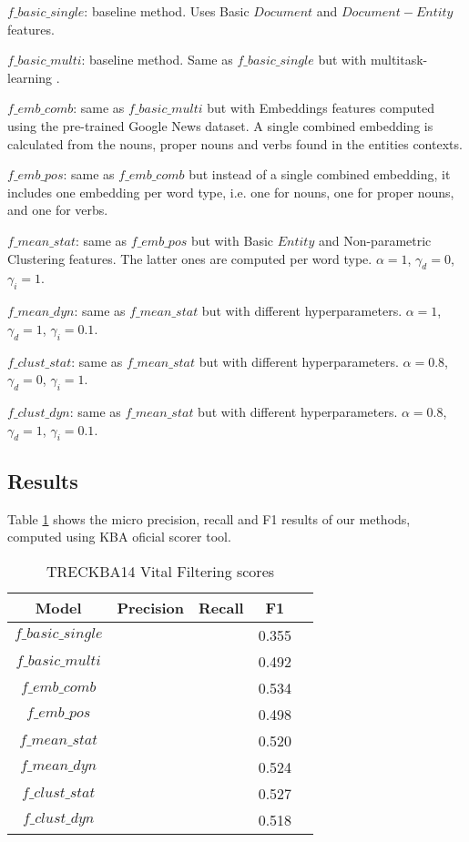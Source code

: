 \documentclass{article}
\begin{document}
\begin{itemize*}
  \item $f\_basic\_single$: baseline method. Uses Basic $Document$ and $Document-Entity$ features.
  \item $f\_basic\_multi$: baseline method. Same as $f\_basic\_single$ but with multitask-learning \cite{Caruana93multitasklearning}.
  \item $f\_emb\_comb$: same as $f\_basic\_multi$ but with Embeddings features computed using the pre-trained Google News dataset. A single combined embedding is calculated from the nouns, proper nouns and verbs found in the entities contexts.
  \item $f\_emb\_pos$: same as $f\_emb\_comb$ but instead of a single combined embedding, it includes one embedding per word type, i.e. one for nouns, one for proper nouns, and one for verbs.
  \item $f\_mean\_stat$: same as $f\_emb\_pos$ but with Basic $Entity$ and Non-parametric Clustering features. The latter ones are computed per word type. $\alpha = 1$, $\gamma_d = 0$, $\gamma_i = 1$.
  \item $f\_mean\_dyn$: same as $f\_mean\_stat$ but with different hyperparameters. $\alpha = 1$, $\gamma_d = 1$, $\gamma_i = 0.1$.
  \item $f\_clust\_stat$: same as $f\_mean\_stat$ but with different hyperparameters. $\alpha = 0.8$, $\gamma_d = 0$, $\gamma_i = 1$.
  \item $f\_clust\_dyn$: same as $f\_mean\_stat$ but with different hyperparameters. $\alpha = 0.8$, $\gamma_d = 1$, $\gamma_i = 0.1$.
\end{itemize*}

\subsection{Results}

Table \ref{res} shows the micro precision, recall and F1 results of our methods, computed using KBA oficial scorer tool.

\begin{table}[H]
\center
\begin{tabular}{|c|c|c|c|c|} \hline
\textbf{Model} & \textbf{Precision} & \textbf{Recall} & \textbf{F1} \\ \hline\hline
$f\_basic\_single$ & & & 0.355 \\ \hline
$f\_basic\_multi$ & & & 0.492 \\ \hline
$f\_emb\_comb$ & & & 0.534 \\ \hline
$f\_emb\_pos$ & & & 0.498 \\ \hline
$f\_mean\_stat$ & & & 0.520 \\ \hline
$f\_mean\_dyn$ & & & 0.524 \\ \hline
$f\_clust\_stat$ & & & 0.527 \\ \hline
$f\_clust\_dyn$ & & & 0.518 \\ \hline
\end{tabular}
\caption{TRECKBA14 Vital Filtering scores}
\label{res}
\end{table}
\end{document}
